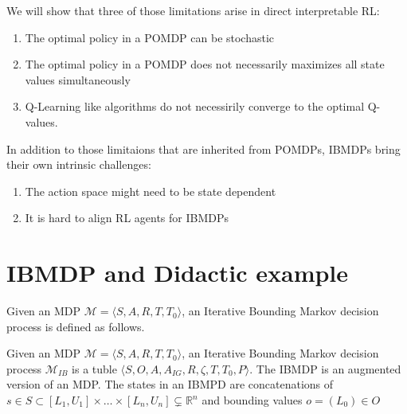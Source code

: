 We will show that three of those limitations arise in direct interpretable RL:
\begin{enumerate}
    \item The optimal policy in a POMDP can be stochastic
    \item The optimal policy in a POMDP does not necessarily maximizes all state values simultaneously
    \item Q-Learning like algorithms do not necessirily converge to the optimal Q-values.
\end{enumerate}

In addition to those limitaions that are inherited from POMDPs, IBMDPs bring their own intrinsic challenges:
\begin{enumerate}
    \item The action space might need to be state dependent
    \item It is hard to align RL agents for IBMDPs
\end{enumerate}

\section{IBMDP and Didactic example}
Given an MDP $\mathcal{M}= \langle S, A, R, T, T_0 \rangle$, an Iterative Bounding Markov decision process is defined as follows.
\begin{definition}
    Given an MDP $\mathcal{M}= \langle S, A, R, T, T_0 \rangle$, an Iterative Bounding Markov decision process $\mathcal{M}_{IB}$ is a tuble $\langle S, O, A, A_{IG}, R, \zeta, T, T_0, P\rangle$.
    The IBMDP is an augmented version of an MDP. The states in an IBMPD are concatenations of $s\in S \subset [L_1, U_1]\times\dots \times [L_n, U_n] \subsetneq \mathbb{R}^n$ and bounding values $o = (L_0) \in O$ 
\end{definition}

